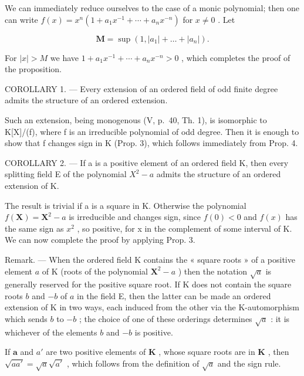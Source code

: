 We can immediately reduce ourselves to the case of a monic polynomial; then one can write \(f(x) = x^{n}(1 + a_{1}x^{-1} + \cdots + a_{n}x^{-n})\) for \(x \neq 0\) . Let

\[
\mathbf {M} = \sup \left(1, | a _ {1} | + \dots + | a _ {n} |\right).
\]

For \(|x| > M\) we have \(1 + a_{1}x^{-1} + \cdots + a_{n}x^{-n} > 0\) , which completes the proof of the proposition.

COROLLARY 1. --- Every extension of an ordered field of odd finite degree admits the structure of an ordered extension.

Such an extension, being monogenous (V, p.~40, Th. 1), is isomorphic to K{[}X{]}/(f), where f is an irreducible polynomial of odd degree. Then it is enough to show that f changes sign in K (Prop. 3), which follows immediately from Prop. 4.

COROLLARY 2. --- If a is a positive element of an ordered field K, then every splitting field E of the polynomial \(X^{2}-a\) admits the structure of an ordered extension of K.

The result is trivial if a is a square in K. Otherwise the polynomial \(f(\mathbf{X}) = \mathbf{X}^{2} - a\) is irreducible and changes sign, since \(f(0) < 0\) and \(f(x)\) has the same sign as \(x^{2}\) , so positive, for x in the complement of some interval of K. We can now complete the proof by applying Prop. 3.

Remark. --- When the ordered field K contains the « square roots » of a positive element \(a\) of K (roots of the polynomial \(\mathbf{X}^2 - a\) ) then the notation \(\sqrt{a}\) is generally reserved for the positive square root. If K does not contain the square roots \(b\) and \(-b\) of \(a\) in the field E, then the latter can be made an ordered extension of K in two ways, each induced from the other via the K-automorphism which sends \(b\) to \(-b\) ; the choice of one of these orderings determines \(\sqrt{a}\) : it is whichever of the elements \(b\) and \(-b\) is positive.

If \(\pmb{a}\) and \(a'\) are two positive elements of \(\mathbf{K}\) , whose square roots are in \(\mathbf{K}\) , then \(\sqrt{aa'} = \sqrt{a}\sqrt{a'}\) , which follows from the definition of \(\sqrt{a}\) and the sign rule.


